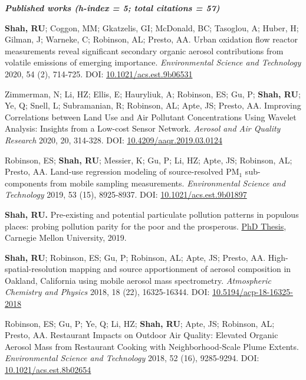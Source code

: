 \documentclass{article}
\begin{document}
\hrulefill
\textit{\textbf{  Published works (h-index = 5; total citations = 57)  }}
\hrulefill
\begin{etaremune}
\item \textbf{Shah, RU}; Coggon, MM; Gkatzelis, GI; McDonald, BC; Tasoglou, A; Huber, H; Gilman, J; Warneke, C; Robinson, AL; Presto, AA. Urban oxidation flow reactor measurements reveal significant secondary organic aerosol contributions from volatile emissions of emerging importance. \textit{Environmental Science and Technology} 2020, 54 (2), 714-725. DOI: \href{https://doi.org/10.1021/acs.est.9b06531}{10.1021/acs.est.9b06531}
\item Zimmerman, N; Li, HZ; Ellis, E; Hauryliuk, A; Robinson, ES; Gu, P; \textbf{Shah, RU}; Ye, Q; Snell, L; Subramanian, R; Robinson, AL; Apte, JS; Presto, AA. Improving Correlations between Land Use and Air Pollutant Concentrations Using Wavelet Analysis: Insights from a Low-cost Sensor Network. \textit{Aerosol and Air Quality Research} 2020, 20, 314-328. DOI: \href{http://www.aaqr.org/doi/10.4209/aaqr.2019.03.0124}{10.4209/aaqr.2019.03.0124}
\item Robinson, ES; \textbf{Shah, RU}; Messier, K; Gu, P; Li, HZ; Apte, JS; Robinson, AL; Presto, AA. Land-use regression modeling of source-resolved PM$_1$ sub-components from mobile sampling measurements. \textit{Environmental Science and Technology} 2019, 53 (15), 8925-8937. DOI: \href{https://doi.org/10.1021/acs.est.9b01897}{10.1021/acs.est.9b01897}
\item \textbf{Shah, RU.} Pre-existing and potential particulate pollution patterns in populous places: probing pollution parity for the poor and the prosperous. \href{https://search.proquest.com/openview/a52fa8ba9f1b4ffe2e6e7b09ca6e2397/1.pdf?pq-origsite=gscholar&cbl=18750&diss=y}{PhD Thesis}, Carnegie Mellon University, 2019.
\item \textbf{Shah, RU}; Robinson, ES; Gu, P; Robinson, AL; Apte, JS; Presto, AA. High-spatial-resolution mapping and source apportionment of aerosol composition in Oakland, California using mobile aerosol mass spectrometry. \textit{Atmospheric Chemistry and Physics} 2018, 18 (22), 16325-16344. DOI: \href{https://www.atmos-chem-phys.net/18/16325/2018/}{10.5194/acp-18-16325-2018}
\item Robinson, ES; Gu, P; Ye, Q; Li, HZ; \textbf{Shah, RU}; Apte, JS; Robinson, AL; Presto, AA. Restaurant Impacts on Outdoor Air Quality: Elevated Organic Aerosol Mass from Restaurant Cooking with Neighborhood-Scale Plume Extents. \textit{Environmental Science and Technology} 2018, 52 (16), 9285-9294. DOI: \href{http://pubs.acs.org/doi/10.1021/acs.est.8b02654}{10.1021/acs.est.8b02654}

\end{etaremune}
\end{document}
